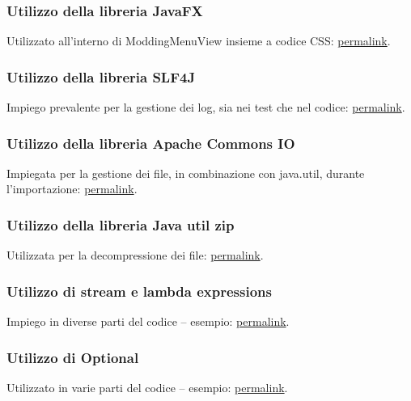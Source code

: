 \documentclass[a4paper,12pt]{report}
\begin{document}
\subsubsection{Utilizzo della libreria JavaFX}
Utilizzato all'interno di ModdingMenuView insieme a codice CSS: \href{https://github.com/Matt2309/OOP24-temple-tower/blob/297b37062035f41c3e9258656beace208905a368/src/main/java/it/unibo/templetower/view/ModdingMenuView.java#L49C2-L54C72}{permalink}.
\subsubsection{Utilizzo della libreria SLF4J}
Impiego prevalente per la gestione dei log, sia nei test che nel codice: \href{https://github.com/Matt2309/OOP24-temple-tower/blob/297b37062035f41c3e9258656beace208905a368/src/test/java/it/unibo/templetower/AppTest.java#L22C1-L34C6}{permalink}.
\subsubsection{Utilizzo della libreria Apache Commons IO}
Impiegata per la gestione dei file, in combinazione con java.util, durante l'importazione: \href{https://github.com/Matt2309/OOP24-temple-tower/blob/297b37062035f41c3e9258656beace208905a368/src/main/java/it/unibo/templetower/model/ModdingMenuModel.java#L92C1-L95C10}{permalink}.
\subsubsection{Utilizzo della libreria Java util zip}
Utilizzata per la decompressione dei file: \href{https://github.com/Matt2309/OOP24-temple-tower/blob/297b37062035f41c3e9258656beace208905a368/src/main/java/it/unibo/templetower/model/ModdingMenuModel.java#L161C1-L192C10}{permalink}. 
\subsubsection{Utilizzo di stream e lambda expressions}
Impiego in diverse parti del codice – esempio: \href{https://github.com/Matt2309/OOP24-temple-tower/blob/297b37062035f41c3e9258656beace208905a368/src/main/java/it/unibo/templetower/model/ModdingMenuModel.java#L275C13-L293C31}{permalink}.
\subsubsection{Utilizzo di Optional}
Utilizzato in varie parti del codice – esempio: \href{https://github.com/Matt2309/OOP24-temple-tower/blob/297b37062035f41c3e9258656beace208905a368/src/main/java/it/unibo/templetower/controller/GameDataManagerImpl.java#L244C1-L246C6}{permalink}.
\end{document}
